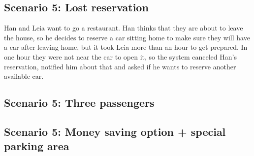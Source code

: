 \subsection{Scenario 5: Lost reservation}
	Han and Leia want to go a restaurant. Han thinks that they are about to leave the house, so he decides to reserve a car sitting home to make sure they will have a car after leaving home, but it took Leia more than an hour to get prepared. In one hour they were not near the car to open it, so the system canceled Han's reservation, notified him about that and asked if he wants to reserve another available car.    	
	
\subsection{Scenario 5: Three passengers}	
	
	
\subsection{Scenario 5: Money saving option + special parking area}	
	
	
	
	
	
	
	
	
	
